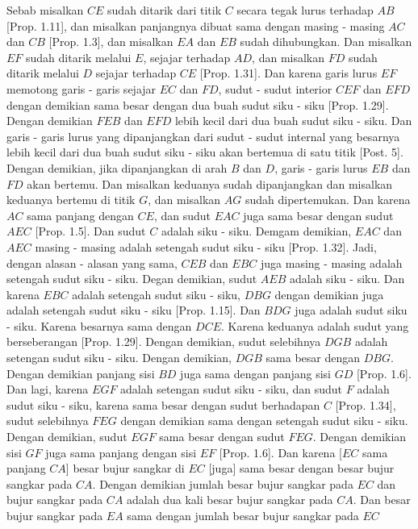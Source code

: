 \documentclass[a4paper]{book}
\begin{document}
Sebab misalkan $CE$ sudah ditarik dari titik $C$ secara tegak lurus terhadap
$AB$ [Prop. 1.11], dan misalkan panjangnya dibuat sama dengan masing - masing
$AC$ dan $CB$ [Prop. 1.3], dan misalkan $EA$ dan $EB$ sudah dihubungkan. Dan
misalkan $EF$ sudah ditarik melalui $E$, sejajar terhadap $AD$, dan misalkan
$FD$ sudah ditarik melalui $D$ sejajar terhadap $CE$ [Prop. 1.31]. Dan karena
garis lurus $EF$ memotong garis - garis sejajar $EC$ dan $FD$, sudut - sudut 
interior $CEF$ dan $EFD$ dengan demikian sama besar dengan dua buah sudut 
siku - siku [Prop. 1.29]. Dengan demikian $FEB$ dan $EFD$ lebih kecil dari
dua buah sudut siku - siku. Dan garis - garis lurus yang dipanjangkan dari
sudut - sudut internal yang besarnya lebih kecil dari dua buah sudut siku -
siku akan bertemua di satu titik [Post. 5]. Dengan demikian, jika dipanjangkan
di arah $B$ dan $D$, garis - garis lurus $EB$ dan $FD$ akan bertemu. Dan 
misalkan keduanya sudah dipanjangkan dan misalkan keduanya bertemu di titik 
$G$, dan misalkan $AG$ sudah dipertemukan. Dan karena $AC$ sama panjang dengan
$CE$, dan sudut $EAC$ juga sama besar dengan sudut $AEC$ [Prop. 1.5]. Dan 
sudut $C$ adalah siku - siku. Demgam demikian, $EAC$ dan $AEC$ masing - masing
adalah setengah sudut siku - siku [Prop. 1.32]. Jadi, dengan alasan - alasan
yang sama, $CEB$ dan $EBC$ juga masing - masing adalah setengah sudut siku - 
siku. Degan demikian, sudut $AEB$ adalah siku - siku. Dan karena $EBC$ adalah
setengah sudut siku - siku, $DBG$ dengan demikian juga adalah setengah sudut
siku - siku [Prop. 1.15]. Dan $BDG$ juga adalah sudut siku - siku. Karena 
besarnya sama dengan $DCE$. Karena keduanya adalah sudut yang berseberangan
[Prop. 1.29]. Dengan demikian, sudut selebihnya $DGB$ adalah setengan sudut
siku - siku. Dengan demikian, $DGB$ sama besar dengan $DBG$. Dengan demikian
panjang sisi $BD$ juga sama dengan panjang sisi $GD$ [Prop. 1.6]. Dan lagi,
karena $EGF$ adalah setengan sudut siku - siku, dan sudut $F$ adalah sudut
siku - siku, karena sama besar dengan sudut berhadapan $C$ [Prop. 1.34], 
sudut selebihnya $FEG$ dengan demikian sama dengan setengah sudut siku - siku.
Dengan demikian, sudut $EGF$ sama besar dengan sudut $FEG$. Dengan demikian
sisi $GF$ juga sama panjang dengan sisi $EF$ [Prop. 1.6]. Dan karena [$EC$ 
sama panjang $CA$] besar bujur sangkar di $EC$ [juga] sama besar dengan besar
bujur sangkar pada $CA$. Dengan demikian jumlah besar bujur sangkar pada $EC$ 
dan bujur sangkar pada $CA$ adalah dua kali besar bujur sangkar pada $CA$. Dan
besar bujur sangkar pada $EA$ sama dengan jumlah besar bujur sangkar pada $EC$
\end{document}
